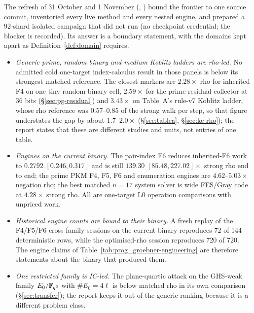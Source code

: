 The refresh of 31 October and 1 November
(,
)
bound the frontier to one source commit, inventoried every live method and
every nested engine, and prepared a 92-shard isolated campaign that did not
run (no checkpoint credential; the blocker is recorded). Its answer is a
boundary statement, with the domains kept apart as
Definition~\ref{def:domain} requires.
\begin{itemize}
\item \emph{Generic prime, random binary and medium Koblitz ladders are
  rho-led.} No admitted cold one-target index-calculus result in those
  panels is below its strongest matched reference. The closest markers are
  $2.28\times$ rho for inherited F4 on one tiny random-binary cell, $2.59\times$
  for the prime residual collector at 36 bits (\S\ref{sec:pg-residual}) and
  $3.43\times$ on Table~A's rule-v7 Koblitz ladder, whose rho reference
  was $0.57$--$0.85$ of the strong walk per step, so that figure understates
  the gap by about $1.7$--$2.0\times$ (\S\ref{sec:tablea},
  \S\ref{sec:kc-rho}); the report states that these are different studies
  and units, not entries of one table.
\item \emph{Engines on the current binary.} The pair-index F6 reduces
  inherited-F6 work to $0.2792$ $[0.246,0.317]$ and is still $139.30$
  $[85.48,227.02]\times$ strong rho end to end; the prime PKM F4, F5, F6 and
  enumeration engines are $4.62$--$5.03\times$ negation rho; the best
  matched $n=17$ system solver is wide FES/Gray code at $4.28\times$ strong
  rho. All are one-target L0 operation comparisons with unpriced work.
\item \emph{Historical engine counts are bound to their binary.} A fresh
  replay of the F4/F5/F6 cross-family sessions on the current binary
  reproduces 72 of 144 deterministic rows, while the optimised-rho session
  reproduces 720 of 720. The engine claims of Table~\ref{tab:prog_groebner-engineering}
  are therefore statements about the binary that produced them.
\item \emph{One restricted family is IC-led.} The plane-quartic attack on
  the GHS-weak family $E_0/\mathbb{F}_{q^3}$ with $\#E_0=4\ell$ is below matched
  rho in its own comparison (\S\ref{sec:transfer}); the report keeps it out
  of the generic ranking because it is a different problem class.
\end{itemize}

